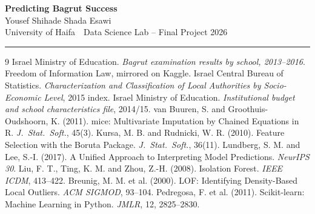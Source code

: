 \documentclass[11pt]{article}
\begin{document}
\begin{center}
    {\LARGE\bfseries Predicting Bagrut Success}\\[16pt]
    {\large Yousef Shihade \quad Shada Esawi}\\[14pt]
    University of Haifa \,\textbullet\, Data Science Lab -- Final Project 2026\\[10pt]
    \rule{\textwidth}{0.4pt}
\end{center}










\begingroup
\footnotesize
\setlength{\parskip}{0pt}
\begin{thebibliography}{9}
\setlength{\itemsep}{0pt}
\setlength{\parsep}{0pt}
 Israel Ministry of Education. \emph{Bagrut examination results
  by school, 2013--2016}. Freedom of Information Law, mirrored on Kaggle.
 Israel Central Bureau of Statistics. \emph{Characterization and
  Classification of Local Authorities by Socio-Economic Level}, 2015 index.
 Israel Ministry of Education. \emph{Institutional budget and
  school characteristics file}, 2014/15.
 van Buuren, S. and Groothuis-Oudshoorn, K. (2011). mice:
  Multivariate Imputation by Chained Equations in R. \emph{J.\ Stat.\ Soft.}, 45(3).
 Kursa, M. B. and Rudnicki, W. R. (2010). Feature Selection with
  the Boruta Package. \emph{J.\ Stat.\ Soft.}, 36(11).
 Lundberg, S. M. and Lee, S.-I. (2017). A Unified Approach to
  Interpreting Model Predictions. \emph{NeurIPS 30}.
 Liu, F. T., Ting, K. M. and Zhou, Z.-H. (2008). Isolation
  Forest. \emph{IEEE ICDM}, 413--422.
 Breunig, M. M. et al. (2000). LOF: Identifying Density-Based Local
  Outliers. \emph{ACM SIGMOD}, 93--104.
 Pedregosa, F. et al. (2011). Scikit-learn: Machine Learning in
  Python. \emph{JMLR}, 12, 2825--2830.
\end{thebibliography}
\endgroup
\end{document}
